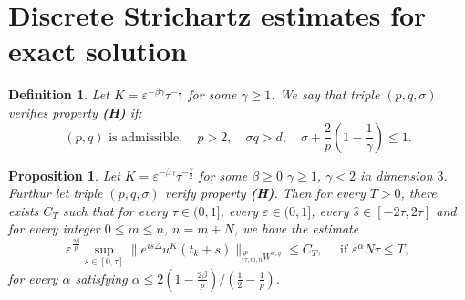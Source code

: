 \documentclass[10pt,a4paper]{article}
\newtheorem{definition}[theorem]{Definition}
\newtheorem{proposition}[theorem]{Proposition}
\begin{document}
  \section{Discrete Strichartz estimates for exact solution}\label{sec:DSE-exact-sol}





  \begin{definition}
    Let \(K=\varepsilon^{-\beta\gamma}\tau^{-\frac\gamma2}\) for some \(\gamma
    \geq 1\). We say that triple \((p,q,\sigma)\) verifies property {\bf (H)}
    if:
    \[ (p,q) \text{ is admissible}, \quad p>2,\quad \sigma q > d, \quad 
    \sigma + \frac2p(1-\frac1\gamma) \leq 1 .
    \]
  \end{definition}

  \begin{proposition}\label{uKlpLq}
    Let \(K = \varepsilon^{-\beta\gamma}\tau^{-\frac\gamma2}\) for some
    \(\beta\geq0\) \(\gamma\geq1\), \(\gamma<2\) in dimension \(3\). Furthur let
    triple \((p,q,\sigma)\) verify property {\bf (H)}.  Then for every \(T > 0\),
    there exists \(C_T\) such that for every \( \tau \in (0,1] \), every \(\varepsilon \in (0,1]\), 
    every \(\hat{s} \in [-2\tau,2\tau] \) and for every integer 
    \(0 \leq m \leq n \), \(n=m+N\), we have the estimate
    \begin{equation}
      \varepsilon^{\frac{2\beta}p} \sup_{s\in[0,\tau]} \|e^{i\hat{s}\Delta}u^K(t_k+s)\|_{l^p_{\tau,m,n}W^{\sigma,q}}
      \leq C_T,\quad \text{ if } \varepsilon^\alpha N\tau \leq T,
    \end{equation}
    for every \(\alpha\) satisfying \(\alpha \leq {2(1-\frac{2\beta}p)}/(\frac12-\frac1p)\).
  \end{proposition}
\end{document}
